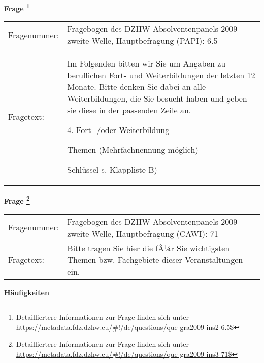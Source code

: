 				\vspace*{0.5cm}
                \noindent\textbf{Frage
	                \footnote{Detailliertere Informationen zur Frage finden sich unter
		              \url{https://metadata.fdz.dzhw.eu/\#!/de/questions/que-gra2009-ins2-6.5$}}}\\
				\begin{tabularx}{\hsize}{@{}lX}
					Fragenummer: &
					  Fragebogen des DZHW-Absolventenpanels 2009 - zweite Welle, Hauptbefragung (PAPI):
					  6.5
 \\
					Fragetext: & Im Folgenden bitten wir Sie um Angaben zu beruflichen Fort- und Weiterbildungen der letzten 12 Monate. Bitte denken Sie dabei an alle Weiterbildungen, die Sie besucht haben und geben sie diese in der passenden Zeile an.\par  4. Fort- /oder Weiterbildung\par  Themen (Mehrfachnennung möglich)\par  Schlüssel s. Klappliste B) \\
				\end{tabularx}
				\vspace*{0.5cm}
                \noindent\textbf{Frage
	                \footnote{Detailliertere Informationen zur Frage finden sich unter
		              \url{https://metadata.fdz.dzhw.eu/\#!/de/questions/que-gra2009-ins3-71$}}}\\
				\begin{tabularx}{\hsize}{@{}lX}
					Fragenummer: &
					  Fragebogen des DZHW-Absolventenpanels 2009 - zweite Welle, Hauptbefragung (CAWI):
					  71
 \\
					Fragetext: & Bitte tragen Sie hier die fÃ¼r Sie wichtigsten Themen bzw. Fachgebiete dieser Veranstaltungen ein. \\
				\end{tabularx}





        		\vspace*{0.5cm}
                \noindent\textbf{Häufigkeiten}

